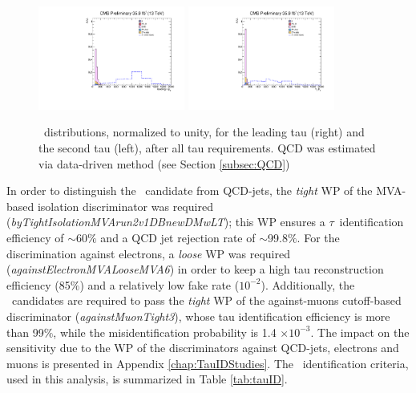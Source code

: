  \begin{figure}[H]
 \begin{center}
 \captionsetup[subfloat]{farskip=0pt,captionskip=0.0cm,labelformat=empty}
 \includegraphics[clip,width=0.43\textwidth]{figuras/Chapter5/TauID_Plots/leadingtaupt.pdf}
  \includegraphics[clip,width=0.43\textwidth]{figuras/Chapter5/TauID_Plots/tau2pt.pdf}
 \end{center}
 \caption{\pt~distributions, normalized to unity, for the leading tau (right) and the second tau (left), after all tau requirements. QCD was estimated via data-driven method (see Section \ref{subsec:QCD})}
 \label{ptdistributions}
 \end{figure}
 
 
\noindent In order to distinguish the \tauh~candidate from QCD-jets, the 
\textit{tight} WP of the MVA-based isolation discriminator was 
required (\textit{byTightIsolationMVArun2v1DBnewDMwLT}); this WP ensures
a $\tau$~identification efficiency of $\sim$60$\%$ and a QCD jet rejection 
rate of $\sim$99.8$\%$. For the discrimination against electrons, 
a \textit{loose} WP was required (\textit{againstElectronMVALooseMVA6}) in order to 
keep a high tau reconstruction efficiency (85$\%$) and a relatively
low fake rate ($10 ^{-2}$). Additionally, the \tauh~candidates are required
to pass the \textit{tight} WP of the against-muons 
cutoff-based discriminator (\textit{againstMuonTight3}), whose 
tau identification efficiency is more than 99$\%$, while the misidentification 
probability is 1.4 $\times 10^{-3}$. The impact on the sensitivity due 
to the WP of the discriminators against QCD-jets, electrons and muons is presented in 
Appendix \ref{chap:TauIDStudies}. The \tauh~identification criteria, used in this 
analysis, is summarized in Table \ref{tab:tauID}.\\

